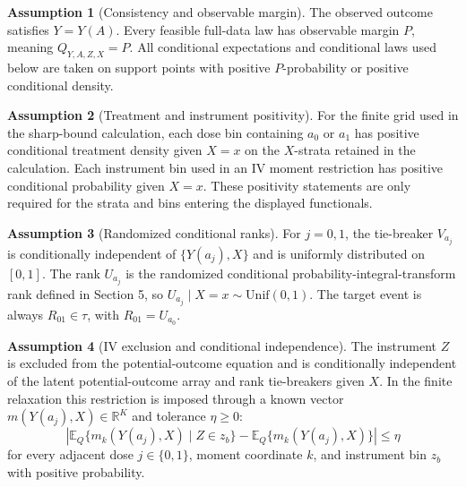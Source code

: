 \documentclass[11pt]{article}
\newcommand{\E}{\mathbb{E}}
\theoremstyle{definition}
\newtheorem{assumption}{Assumption}
\theoremstyle{plain}
\theoremstyle{remark}
\begin{document}
\begin{assumption}[Consistency and observable margin]\label{ass:consistency}
The observed outcome satisfies \(Y=Y(A)\).  Every feasible full-data law has observable margin \(P\), meaning \(Q_{Y,A,Z,X}=P\).  All conditional expectations and conditional laws used below are taken on support points with positive \(P\)-probability or positive conditional density.
\end{assumption}

\begin{assumption}[Treatment and instrument positivity]\label{ass:positivity}
For the finite grid used in the sharp-bound calculation, each dose bin containing \(a_0\) or \(a_1\) has positive conditional treatment density given \(X=x\) on the \(X\)-strata retained in the calculation.  Each instrument bin used in an IV moment restriction has positive conditional probability given \(X=x\).  These positivity statements are only required for the strata and bins entering the displayed functionals.
\end{assumption}

\begin{assumption}[Randomized conditional ranks]\label{ass:ranks}
For \(j=0,1\), the tie-breaker \(V_{a_j}\) is conditionally independent of \(\{Y(a_j),X\}\) and is uniformly distributed on \([0,1]\).  The rank \(U_{a_j}\) is the randomized conditional probability-integral-transform rank defined in Section 5, so \(U_{a_j}\mid X=x\sim\mathrm{Unif}(0,1)\).  The target event is always \(R_{01}\in\tau\), with \(R_{01}=U_{a_0}\).
\end{assumption}

\begin{assumption}[IV exclusion and conditional independence]\label{ass:iv}
The instrument \(Z\) is excluded from the potential-outcome equation and is conditionally independent of the latent potential-outcome array and rank tie-breakers given \(X\).  In the finite relaxation this restriction is imposed through a known vector \(m(Y(a_j),X)\in\mathbb R^K\) and tolerance \(\eta\ge0\):
\[
\left|
\E_Q\{m_k(Y(a_j),X)\mid Z\in z_b\}
-\E_Q\{m_k(Y(a_j),X)\}
\right|\le \eta
\]
for every adjacent dose \(j\in\{0,1\}\), moment coordinate \(k\), and instrument bin \(z_b\) with positive probability.
\end{assumption}
\end{document}
